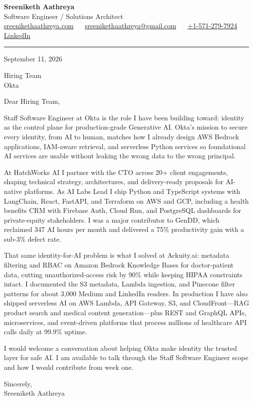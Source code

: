\documentclass[11pt, letterpaper]{article}
\begin{document}
{\fontsize{18 pt}{20 pt}\selectfont\bfseries Sreeniketh Aathreya}\\[4pt]
Software Engineer / Solutions Architect\\[6pt]
\href{https://sreenikethaathreya.com}{sreenikethaathreya.com}
~\textbullet~
\href{mailto:sreenikethaathreya@gmail.com}{sreenikethaathreya@gmail.com}
~\textbullet~
\href{tel:+1-571-279-7924}{+1-571-279-7924}
~\textbullet~
\href{https://www.linkedin.com/in/sreeniketh-aathreya-16800b122/}{LinkedIn}

\vspace{12pt}
\hrule
\vspace{12pt}

September 11, 2026

\vspace{8pt}

Hiring Team\\
Okta

\vspace{12pt}

Dear Hiring Team,

Staff Software Engineer at Okta is the role I have been building toward: identity as the control plane for production-grade Generative AI. Okta's mission to secure every identity, from AI to human, matches how I already design AWS Bedrock applications, IAM-aware retrieval, and serverless Python services so foundational AI services are usable without leaking the wrong data to the wrong principal.

At HatchWorks AI I partner with the CTO across 20+ client engagements, shaping technical strategy, architectures, and delivery-ready proposals for AI-native platforms. As AI Labs Lead I ship Python and TypeScript systems with LangChain, React, FastAPI, and Terraform on AWS and GCP, including a health benefits CRM with Firebase Auth, Cloud Run, and PostgreSQL dashboards for private-equity stakeholders. I was a major contributor to GenDD, which reclaimed 347 AI hours per month and delivered a 75\% productivity gain with a sub-3\% defect rate.

That same identity-for-AI problem is what I solved at Ackuity.ai: metadata filtering and RBAC on Amazon Bedrock Knowledge Bases for doctor-patient data, cutting unauthorized-access risk by 90\% while keeping HIPAA constraints intact. I documented the S3 metadata, Lambda ingestion, and Pinecone filter patterns for about 3,000 Medium and LinkedIn readers. In production I have also shipped serverless AI on AWS Lambda, API Gateway, S3, and CloudFront---RAG product search and medical content generation---plus REST and GraphQL APIs, microservices, and event-driven platforms that process millions of healthcare API calls daily at 99.9\% uptime.

I would welcome a conversation about helping Okta make identity the trusted layer for safe AI. I am available to talk through the Staff Software Engineer scope and how I would contribute from week one.

Sincerely,\\[12pt]
Sreeniketh Aathreya
\end{document}
